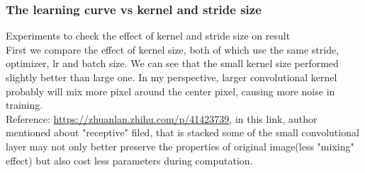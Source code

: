 \documentclass[11pt, a4paper]{article} %
\begin{document}
\subsubsection{The learning curve vs kernel and stride size}
{\Large Experiments to check the effect of kernel and stride size on result}
\\ First we compare the effect of kernel size, both of which use the same stride, optimizer, lr and batch size.
We can see that the small kernel size performed slightly better than large one. In my perspective, larger convolutional kernel probably will mix more pixel around the center pixel, causing more noise in training.
\\ Reference: \url{https://zhuanlan.zhihu.com/p/41423739}, in this link, author mentioned about "receptive" filed, that is stacked some of the small convolutional layer may not only better preserve the properties of original image(less "mixing" effect) but also cost less parameters during computation. 
\end{document}

